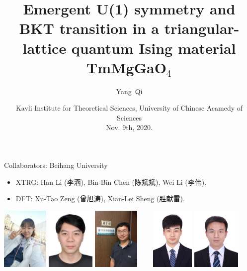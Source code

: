 \documentclass[xcolor=table, aspectratio=1610,ignorenonframetext]{beamer}
\title %
{Emergent U(1) symmetry and BKT transition in a triangular-lattice quantum Ising material TmMgGaO${}_4$}
\author[Y Qi] %
{Yang~Qi}
\institute[Fudan] %
{
Department of Physics, Fudan University.
}
\date{Kavli Institute for Theoretical Sciences, University of Chinese Acamedy of Sciences\\ Nov. 9th, 2020.}
\begin{document}
\begin{frame}
  \titlepage
\end{frame}

\begin{frame}{Collaborators: Beihang University}
\begin{itemize}
	\item XTRG: Han Li (李涵), Bin-Bin Chen (陈斌斌), Wei Li (李伟).
	\item DFT: Xu-Tao Zeng (曾旭涛), Xian-Lei Sheng (胜献雷).
\end{itemize}
	\begin{center}
		\includegraphics[height=3cm]{../people/hanli}
		\includegraphics[height=3cm]{../people/binbinchen}
		\includegraphics[height=3cm]{../people/weili}~~~~
		\includegraphics[height=3cm]{../people/xutaozeng}
		\includegraphics[height=3cm]{../people/xianleisheng}
	\end{center}
\end{frame}
\end{document}
